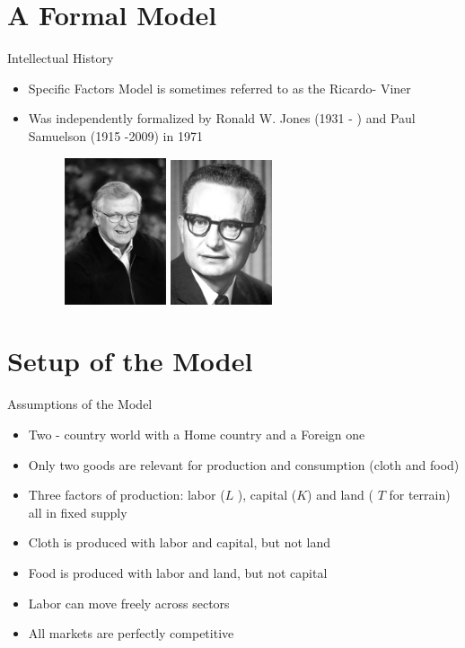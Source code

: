 \documentclass[10pt,hyperref={CJKbookmarks=true},xcolor=dvipsnames,aspectratio=169]{beamer}
\begin{document}
\section{A Formal Model}
\begin{frame}{Intellectual History }

\begin{itemize}
\item Specific Factors Model is sometimes referred to as the Ricardo- Viner 
\item Was independently formalized by Ronald W. Jones (1931 - ) and Paul
Samuelson (1915 -2009) in 1971
\begin{figure}


\centering{}\includegraphics[width=3cm]{fig/sfm/lec4-2}%
\begin{minipage}[t]{1\columnwidth}%
%
\end{minipage} \includegraphics[width=3cm]{fig/sfm/lec4-3}
\end{figure}

\end{itemize}
\end{frame}



\section{Setup of the Model}
\begin{frame}{Assumptions of the Model }

\begin{itemize}
\item Two - country world with a Home country and a Foreign one 
\item Only two goods are relevant for production and consumption (cloth
and food) 
\item Three factors of production: labor ($L$ ), capital ($K$) and land
( $T$ for terrain) all in fixed supply 
\item Cloth is produced with labor and capital, but not land 
\item Food is produced with labor and land, but not capital 
\item Labor can move freely across sectors
\item All markets are perfectly competitive 
\end{itemize}
\end{frame}
\end{document}
